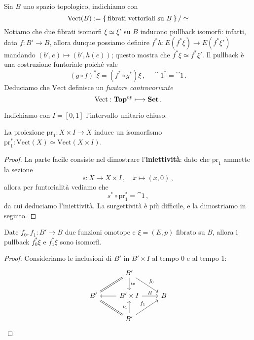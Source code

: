 Sia $B$ uno spazio topologico, indichiamo con
\begin{equation*}
	\mathrm{Vect}(B) := \Set{\text{fibrati vettoriali su } B}/\simeq
\end{equation*}
Notiamo che due fibrati isomorfi $\xi \simeq \xi'$ su $B$
inducono pullback isomorfi: infatti, data $f:B' \to B$,
allora
dunque possiamo definire $f^{*}h : E(f^{*}\xi) \to E(f^{*}\xi')$ mandando $(b',e) \mapsto (b',h(e))$;
questo mostra che $f^{*}\xi \simeq f^{*}\xi'$.
Il pullback è una costruzione funtoriale poiché vale
\begin{equation*}
	(g \circ f)^{*}\xi = (f^{*} \circ g^{*})\xi\,, \quad \cat{1}_{}^{*} = \cat{1}\,.
\end{equation*}
Deduciamo che $\mathrm{Vect}$ definisce un \emph{funtore controvariante} 
\begin{equation*}
	\mathrm{Vect} : {\normalfont\textbf{Top}}^{op} \longmapsto {\normalfont\textbf{Set}}\,.
\end{equation*}



Indichiamo con $I = [0,1]$ l'intervallo unitario chiuso.
\begin{thm}
	La proiezione $\mathrm{pr}_{1}:X \times I \to X$ induce un isomorfismo
	$\mathrm{pr}_{1}^{*} : \mathrm{Vect}(X) \simeq \mathrm{Vect}(X \times I)$.
	\begin{proof}
		La parte facile consiste nel dimostrare l'\textbf{iniettività}:
		dato che $\mathrm{pr}_{1}$ ammette la sezione 
		\begin{equation*}
			s : X \longrightarrow X \times I\,, \quad
			x \longmapsto (x,0)\,,
		\end{equation*}
		allora per funtorialità vediamo che 
		\begin{equation*}
			s^{*} \circ \mathrm{pr}_{1}^{*} = \cat{1}\,,
		\end{equation*}
		da cui deduciamo l'iniettività.
		La surgettività è più difficile, e la dimostriamo in seguito.
	\end{proof}
\end{thm}

\begin{cor}
	Date $f_{0},f_{1}:B' \to B$ due funzioni omotope e $\xi = (E,p)$ fibrato su $B$,
	allora i pullback $f_{0}^{*}\xi$ e $f_{1}^{*}\xi$ sono isomorfi.
	\begin{proof}
		Consideriamo le inclusioni di $B'$ in $B' \times I$ al tempo $0$ e al tempo $1$:
		\begin{equation*}
			\begin{tikzcd}
				& B' \ar[dl, equals] \ar[dr, "f_{0}"] \ar[d, "\iota_{0}"] & \\
				B' 
				& B' \times I \ar[l] \ar[r, "H"]
				& B \\
				& B' \ar[ul, equals] \ar[ur, "f_{1}"] \ar[u, "\iota_{1}"] &
			\end{tikzcd}
		\end{equation*}
	\end{proof}
\end{cor}


